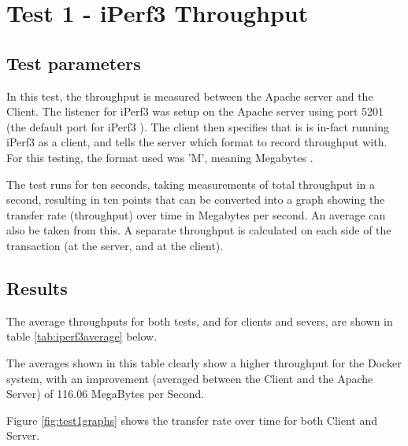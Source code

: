 \section{Test 1 - iPerf3 Throughput}
\label{sec:Test1}
\subsection{Test parameters}
In this test, the throughput is measured between the Apache server and the Client. The listener for iPerf3 was setup on the Apache server using port 5201 (the default port for iPerf3 \citep{iPerf3Documentation}). The client then specifies that is is in-fact running iPerf3 as a client, and tells the server which format to record throughput with. For this testing, the format used was 'M', meaning Megabytes \citep{iPerf3Documentation}.

The test runs for ten seconds, taking measurements of total throughput in a second, resulting in ten points that can be converted into a graph showing the transfer rate (throughput) over time in Megabytes per second. An average can also be taken from this. A separate throughput is calculated on each side of the transaction (at the server, and at the client).
 
\subsection{Results}
\label{test1results}
The average throughputs for both tests, and for clients and severs, are shown in table \ref{tab:iperf3average} below.

\begin{table}[h]
\centering
\caption{Table showing the average transfer rate in a 10 second period}
\label{tab:iperf3average}
\end{table}

The averages shown in this table clearly show a higher throughput for the Docker system, with an improvement (averaged between the Client and the Apache Server) of 116.06 MegaBytes per Second.

Figure \ref{fig:test1graphs} shows the transfer rate over time for both Client and Server.

